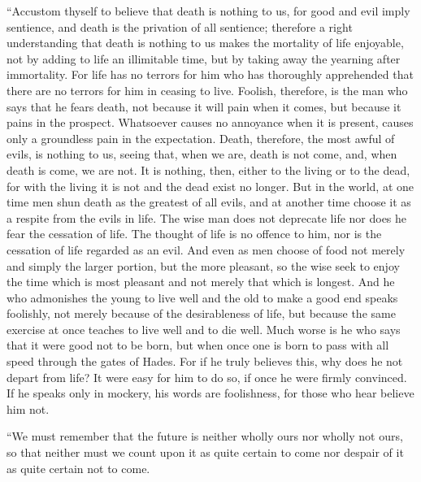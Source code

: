 ``Accustom thyself to believe that death is nothing to us, for good
and evil imply sentience, and death is the privation of all sentience;
therefore a right understanding that death is nothing to us makes the
mortality of life enjoyable, not by adding to life an illimitable
time, but by taking away the yearning after immortality. For life has
no terrors for him who has thoroughly apprehended that there are no
terrors for him in ceasing to live. Foolish, therefore, is the man who
says that he fears death, not because it will pain when it comes, but
because it pains in the prospect. Whatsoever causes no annoyance when
it is present, causes only a groundless pain in the expectation.
Death, therefore, the most awful of evils, is nothing to us, seeing
that, when we are, death is not come, and, when death is come, we are
not. It is nothing, then, either to the living or to the dead, for
with the living it is not and the dead exist no longer. But in the
world, at one time men shun death as the greatest of all evils, and at
another time choose it as a respite from the evils in life. The wise
man does not deprecate life nor does he fear the cessation 
of life. The thought of life is no offence to him, nor is the
cessation of life regarded as an evil. And even as men choose of food
not merely and simply the larger portion, but the more pleasant, so
the wise seek to enjoy the time which is most pleasant and not merely
that which is longest. And he who admonishes the young to live well
and the old to make a good end speaks foolishly, not merely because of
the desirableness of life, but because the same exercise at once
teaches to live well and to die well. Much worse is he who says that
it were good not to be born, but when once one is born to pass with
all speed through the gates of Hades. For if he truly believes this,
why does he not depart from life? It were easy for him to do so, if
once he were firmly convinced. If he speaks only in mockery, his words
are foolishness, for those who hear believe him not.

``We must remember that the future is neither wholly ours nor wholly
not ours, so that neither must we count upon it as quite certain to
come nor despair of it as quite certain not to come.

